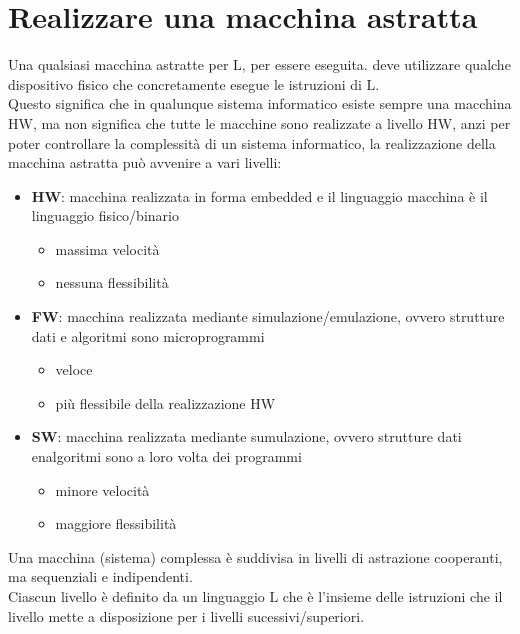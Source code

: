\section{Realizzare una macchina astratta}
Una qualsiasi macchina astratte per $\mathrm{L}$, per essere eseguita. deve utilizzare qualche dispositivo fisico che concretamente esegue le istruzioni di $\mathrm{L}$.\\[0.2ex]
Questo significa che in qualunque sistema informatico esiste sempre una macchina HW, ma non significa che tutte le macchine sono realizzate a livello HW, anzi per poter controllare la complessità di un sistema informatico, la realizzazione della macchina astratta può avvenire a vari livelli:
\begin{itemize}[label=$\triangleright$, itemsep=\smallskipamount]
    \item \textbf{HW}: macchina realizzata in forma embedded e il linguaggio macchina è il linguaggio fisico/binario
    \begin{itemize}[itemsep=\smallskipamount]
        \item massima velocità
        \item nessuna flessibilità
    \end{itemize}
    \item \textbf{FW}: macchina realizzata mediante simulazione/emulazione, ovvero strutture dati e algoritmi sono microprogrammi
    \begin{itemize}[itemsep=\smallskipamount]
        \item veloce
        \item più flessibile della realizzazione HW
    \end{itemize}
    \item \textbf{SW}: macchina realizzata mediante sumulazione, ovvero strutture dati enalgoritmi sono a loro volta dei programmi
    \begin{itemize}[itemsep=\smallskipamount]
        \item minore velocità
        \item maggiore flessibilità
    \end{itemize}
\end{itemize}

Una macchina (sistema) complessa è suddivisa in livelli di astrazione cooperanti, ma sequenziali e indipendenti.\\[0.2ex]
Ciascun livello è definito da un linguaggio $\mathrm{L}$ che è l'insieme delle istruzioni che il livello mette a disposizione per i livelli sucessivi/superiori.

